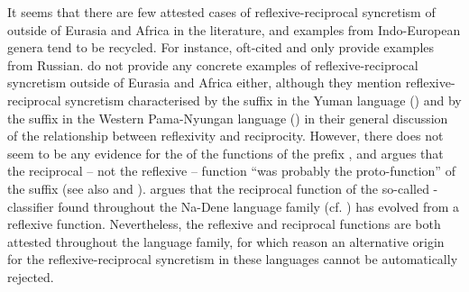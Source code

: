 It seems that there are few attested cases of reflexive-reciprocal syncretism of  outside of Eurasia and Africa in the literature, and examples from Indo-European genera tend to be recycled. For instance, oft-cited \cite[254]{heine:kuteva:2002} and \cite[233ff.]{maslova:2008} only provide examples from Russian. \cite{heine:miyashita:2008} do not provide any concrete examples of reflexive-reciprocal syncretism outside of Eurasia and Africa either, although they mention reflexive-reciprocal syncretism characterised by the suffix  in the Yuman language  () and by the suffix  in the Western Pama-Nyungan language  () in their general discussion of the relationship between reflexivity and reciprocity. However, there does not seem to be any evidence for the  of the functions of the  prefix \citep{watahomigie:al:1982, sohn:j-s:1995, ichihashi-nakayama:al:1997}, and \cite[149]{waters:1989} argues that the reciprocal -- not the reflexive -- function “was probably the proto-function” of the  suffix (see also  and \citealt[199f.]{heine:miyashita:2008}). \cite[375]{thompson:1996} argues that the reciprocal function of the so-called -classifier found throughout the Na-Dene language family (cf.  ) has evolved from a reflexive function. Nevertheless, the reflexive and reciprocal functions are both attested throughout the language family, for which reason an alternative origin for the reflexive-reciprocal syncretism in these languages cannot be automatically rejected.

